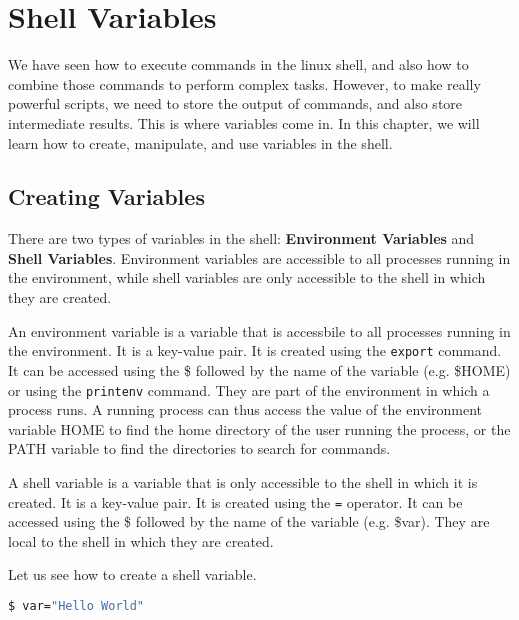 \chapter{Shell Variables}

We have seen how to execute commands in the linux shell, and also how to
combine those commands to perform complex tasks. However, to make really
powerful scripts, we need to store the output of commands, and also store
intermediate results. This is where variables come in. In this chapter,
we will learn how to create, manipulate, and use variables in the shell.

\section{Creating Variables}

There are two types of variables in the shell: \textbf{Environment Variables}
and \textbf{Shell Variables}. Environment variables are accessible to all
processes running in the environment, while shell variables are only accessible
to the shell in which they are created.

\begin{definition}
  An environment variable is a variable that is accessbile to all
  processes running in the environment. It is a key-value pair.
  It is created using the \lstinline{export} command. It can be accessed
  using the \$ followed by the name of the variable (e.g. \$HOME) or
  using the \lstinline{printenv} command.
  They are part of the environment in which a process runs. 
  A running process can thus access the value of the environment variable
  HOME to find the home directory of the user running the process,
  or the PATH variable to find the directories to search for commands.
\end{definition}

\begin{definition}
  A shell variable is a variable that is only accessible to the shell
  in which it is created. It is a key-value pair. It is created using
  the \lstinline{=} operator. It can be accessed using the \$ followed by the name
  of the variable (e.g. \$var).
  They are local to the shell in which they are created.
\end{definition}

Let us see how to create a shell variable.

\begin{lstlisting}[language=bash]
$ var="Hello World"
\end{lstlisting}

